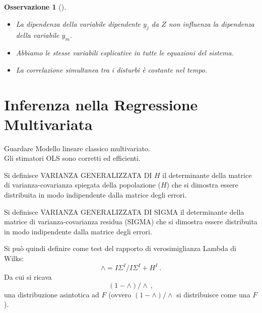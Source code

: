 \documentclass[a4page, 11pt]{article} %
\newtheorem*{remark}{Osservazione}
\begin{document}
\begin{remark}[]\ \\
\begin{itemize}
\item La dipendenza della variabile dipendente $y_j$ da $Z$ non influenza la dipendenza della variabile $y_m$.
\item Abbiamo le stesse variabili esplicative in tutte le equazioni del sistema.
\item La correlazione simultanea tra i disturbi è costante nel tempo.
\end{itemize}
\end{remark}
\section{Inferenza nella Regressione Multivariata}

Guardare Modello lineare classico multivariato.\\
Gli stimatori OLS sono corretti ed efficienti. 

Si definisce VARIANZA GENERALIZZATA DI $H$ il determinante della matrice di varianza-covarianza spiegata della popolazione ($H$) che si dimostra essere distribuita in modo indipendente dalla matrice degli errori.

Si definisce VARIANZA GENERALIZZATA DI SIGMA il determinante della matrice di varianza-covarianza residua (SIGMA) che si dimostra essere distribuita in modo indipendente dalla matrice degli errori.

Si può quindi definire come test del rapporto di verosimiglianza Lambda di Wilks: \begin{equation*}
\wedge=I\Sigma^{I} /I \Sigma^{I} + H^{I}\ . 
\end{equation*}
Da cui si ricava 
\begin{equation*}
(1- \wedge ) / \wedge \ ,
\end{equation*}
una distribuzione asintotica ad $F$ (ovvero $(1-\wedge)/ \wedge$ si distribuisce come una $F$).
\end{document}
